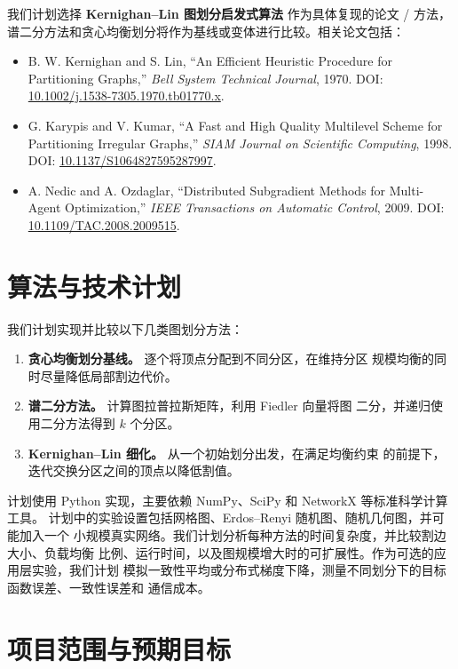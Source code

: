 \documentclass[UTF8, 10pt]{ctexart}
\begin{document}
我们计划选择 \textbf{Kernighan--Lin 图划分启发式算法} 作为具体复现的论文 /
方法，谱二分方法和贪心均衡划分将作为基线或变体进行比较。相关论文包括：
\begin{itemize}
    \item B. W. Kernighan and S. Lin, ``An Efficient Heuristic Procedure for
    Partitioning Graphs,'' \emph{Bell System Technical Journal}, 1970.
    DOI: \href{https://doi.org/10.1002/j.1538-7305.1970.tb01770.x}
    {10.1002/j.1538-7305.1970.tb01770.x}.
    \item G. Karypis and V. Kumar, ``A Fast and High Quality Multilevel Scheme
    for Partitioning Irregular Graphs,'' \emph{SIAM Journal on Scientific
    Computing}, 1998. DOI: \href{https://doi.org/10.1137/S1064827595287997}
    {10.1137/S1064827595287997}.
    \item A. Nedic and A. Ozdaglar, ``Distributed Subgradient Methods for
    Multi-Agent Optimization,'' \emph{IEEE Transactions on Automatic Control},
    2009. DOI: \href{https://doi.org/10.1109/TAC.2008.2009515}
    {10.1109/TAC.2008.2009515}.
\end{itemize}

\section{算法与技术计划}

我们计划实现并比较以下几类图划分方法：
\begin{enumerate}
    \item \textbf{贪心均衡划分基线。} 逐个将顶点分配到不同分区，在维持分区
    规模均衡的同时尽量降低局部割边代价。
    \item \textbf{谱二分方法。} 计算图拉普拉斯矩阵，利用 Fiedler 向量将图
    二分，并递归使用二分方法得到 $k$ 个分区。
    \item \textbf{Kernighan--Lin 细化。} 从一个初始划分出发，在满足均衡约束
    的前提下，迭代交换分区之间的顶点以降低割值。
\end{enumerate}

计划使用 Python 实现，主要依赖 NumPy、SciPy 和 NetworkX 等标准科学计算工具。
计划中的实验设置包括网格图、Erdos--Renyi 随机图、随机几何图，并可能加入一个
小规模真实网络。我们计划分析每种方法的时间复杂度，并比较割边大小、负载均衡
比例、运行时间，以及图规模增大时的可扩展性。作为可选的应用层实验，我们计划
模拟一致性平均或分布式梯度下降，测量不同划分下的目标函数误差、一致性误差和
通信成本。

\section{项目范围与预期目标}
\end{document}
